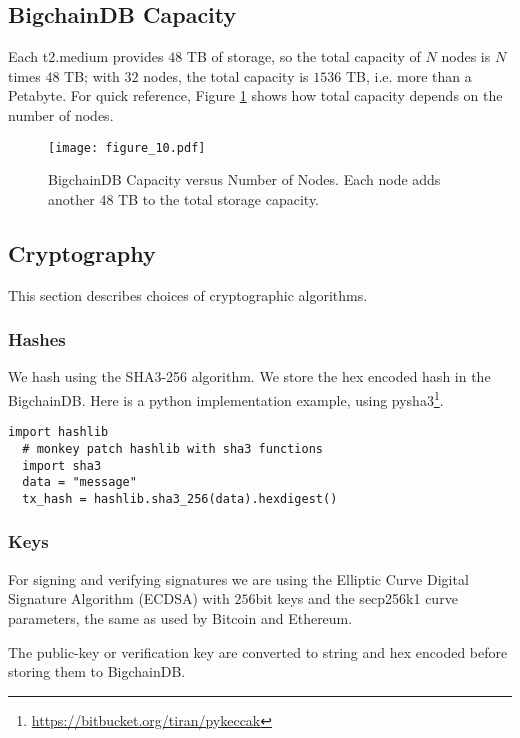 \subsection{BigchainDB Capacity}
Each t2.medium provides $48$ TB of storage, so the total capacity of $N$ nodes is $N$ times $48$ TB; with $32$ nodes, the total capacity is $1536$ TB, i.e. more than a Petabyte.
For quick reference, Figure \ref{fig:bigchain_capacity_vs_nodes} shows how total capacity depends on the number of nodes. 

\begin{figure}[!ht]
  \centering
  \texttt{[image: figure\_10.pdf]}
  \caption{BigchainDB Capacity versus Number of Nodes. Each node adds another $48$ TB to the total storage capacity.}
  \label{fig:bigchain_capacity_vs_nodes}
\end{figure}

\subsection{Cryptography}

This section describes choices of cryptographic algorithms. 

\subsubsection{Hashes}

We hash using the SHA3-256 algorithm. We store the hex encoded hash in the BigchainDB. Here is a python implementation example, using pysha3\footnote{\url{https://bitbucket.org/tiran/pykeccak}}.

\begin{minipage}{\linewidth}
  \begin{lstlisting}[style=python]
  import hashlib 
  # monkey patch hashlib with sha3 functions 
  import sha3 
  data = "message" 
  tx_hash = hashlib.sha3_256(data).hexdigest()\end{lstlisting}
\end{minipage}

\subsubsection{Keys}
For signing and verifying signatures we are using the Elliptic Curve Digital Signature Algorithm (ECDSA) with $256$bit keys and the secp256k1 curve parameters, the same as used by Bitcoin and Ethereum.

The public-key or verification key are converted to string and hex encoded before storing them to BigchainDB.

